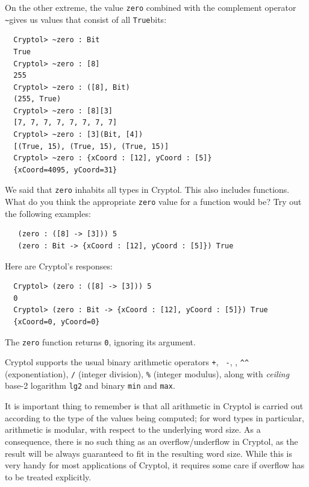 \noindent On the other extreme, the value {\tt zero} combined with the
complement operator {\tt \Verb|~|}\indComplement gives us values that
consist of all {\tt True}\indTrue bits:
\begin{Verbatim}
  Cryptol> ~zero : Bit
  True
  Cryptol> ~zero : [8]
  255
  Cryptol> ~zero : ([8], Bit)
  (255, True)
  Cryptol> ~zero : [8][3]
  [7, 7, 7, 7, 7, 7, 7, 7]
  Cryptol> ~zero : [3](Bit, [4])
  [(True, 15), (True, 15), (True, 15)]
  Cryptol> ~zero : {xCoord : [12], yCoord : [5]}
  {xCoord=4095, yCoord=31}
\end{Verbatim}

\begin{Exercise}\label{ex:zero:0}
  We said that {\tt zero} inhabits all types in Cryptol. This also
  includes functions. What do you think the appropriate {\tt zero}
  value for a function would be?  Try out the following examples:
\begin{Verbatim}
   (zero : ([8] -> [3])) 5
   (zero : Bit -> {xCoord : [12], yCoord : [5]}) True
\end{Verbatim}
\end{Exercise}
\begin{Answer}
Here are Cryptol's responses:\indZero
\begin{Verbatim}
  Cryptol> (zero : ([8] -> [3])) 5
  0
  Cryptol> (zero : Bit -> {xCoord : [12], yCoord : [5]}) True
  {xCoord=0, yCoord=0}
\end{Verbatim}
The {\tt zero} function returns {\tt 0}, ignoring its argument.
\end{Answer}


Cryptol supports the usual binary arithmetic operators {\tt +}, {\tt
  -}, {\tt *}, {\tt \Verb|^^|} (exponentiation), {\tt /} (integer
division), {\tt \%} (integer modulus), along with \emph{ceiling}
base-2 logarithm {\tt lg2} and binary {\tt min} and {\tt max}.

It is important thing to remember is that all arithmetic in Cryptol is
carried out according to the type of the values being computed;
for word types in particular, arithmetic is modular,\indModular
with respect to the underlying word size.  As a
consequence, there is no such thing as an overflow/underflow in
Cryptol, as the result will be always guaranteed to fit in the
resulting word size.  While this is very handy for most applications of
Cryptol, it requires some care if overflow has to be treated
explicitly.\indOverflow\indUnderflow\indPlus\indMinus\indTimes\indDiv\indMod\indLg\indMin\indMax\indExponentiate

